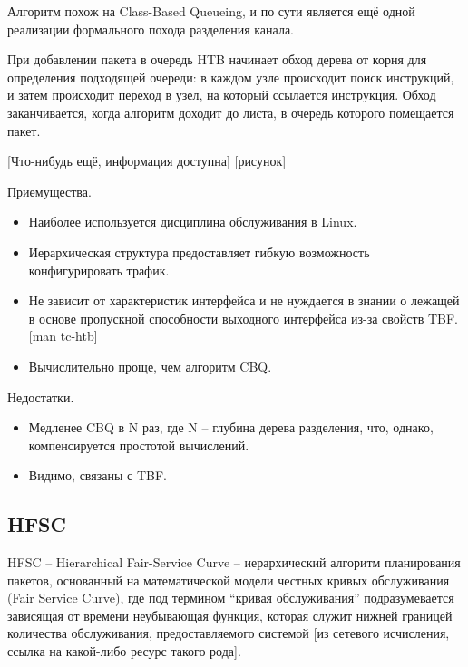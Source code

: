 		Алгоритм похож на Class-Based Queueing, и по сути является ещё одной реализации
		формального похода разделения канала.

		При добавлении пакета в очередь HTB начинает обход дерева от корня
		для определения подходящей очереди: в каждом узле происходит поиск
		инструкций, и затем происходит переход в узел, на который ссылается
		инструкция. Обход заканчивается, когда алгоритм доходит до листа,
		в очередь которого помещается пакет. 

		[Что-нибудь ещё, информация доступна]
    	[рисунок]

		Приемущества.
		\begin{itemize}
			\item Наиболее используется дисциплина обслуживания в Linux.
			\item Иерархическая структура предоставляет гибкую возможность конфигурировать трафик.
            \item Не зависит от характеристик интерфейса и не нуждается в знании о лежащей в
				  основе пропускной способности выходного интерфейса из-за свойств TBF. [man tc-htb]
			\item Вычислительно проще, чем алгоритм CBQ.
		\end{itemize}

		Недостатки.
		\begin{itemize}
			\item Медленее CBQ в N раз, где N -- глубина дерева разделения, что, однако, компенсируется простотой вычислений. 
			\item Видимо, связаны с TBF.
		\end{itemize}

	\subsection{HFSC}

        HFSC -- Hierarchical Fair-Service Curve -- иерархический алгоритм планирования пакетов,
        основанный на математической модели честных кривых обслуживания (Fair Service Curve),
        где под термином “кривая обслуживания” подразумевается зависящая от времени
        неубывающая функция, которая служит нижней границей количества обслуживания,
        предоставляемого системой [из сетевого исчисления, ссылка на какой-либо ресурс
        такого рода].

